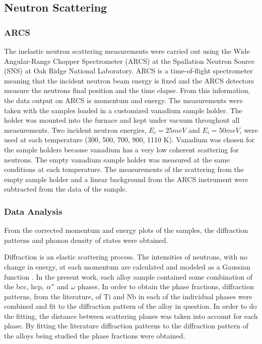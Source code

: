 \subsection{Neutron Scattering}

\subsubsection{ARCS}

The inelastic neutron scattering measurements were carried out using the Wide Angular-Range Chopper Spectrometer (ARCS) at the Spallation Neutron Source (SNS) at Oak Ridge National Laboratory. ARCS is a time-of-flight spectrometer meaning that the incident neutron beam energy is fixed and the ARCS detectors measure the neutrons final position and the time elapse. From this information, the data output on ARCS is momentum and energy. The measurements were taken with the samples loaded in a customized vanadium sample holder. The holder was mounted into the furnace and kept under vacuum throughout all measurements. Two incident neutron energies, $E_{i} = 25 meV$ and $E_{i} = 50 meV$, were used at each temperature (300, 500, 700, 900, 1110 K). Vanadium was chosen for the sample holders because vanadium has a very low coherent scattering for neutrons. The empty vanadium sample holder was measured at the same conditions at each temperature. The measurements of the scattering from the empty sample holder and a linear background from the ARCS instrument were subtracted from the data of the sample. 

\subsubsection{Data Analysis}

From the corrected momentum and energy plots of the samples, the diffraction patterns and phonon density of states were obtained.

Diffraction is an elastic scattering process. The intensities of neutrons, with no change in energy, at each momentum are calculated and modeled as a Gaussian function \cite{Young1998,Toraya1986}. In the present work, each alloy sample contained some combination of the bcc, hcp, $\alpha"$ and $\omega$ phases. In order to obtain the phase fractions, diffraction patterns, from the literature, of Ti and Nb in each of the individual phases were combined and fit to the diffraction pattern of the alloy in question. In order to do the fitting, the distance between scattering planes was taken into account for each phase. By fitting the literature diffraction patterns to the diffraction pattern of the alloys being studied the phase fractions were obtained. 

